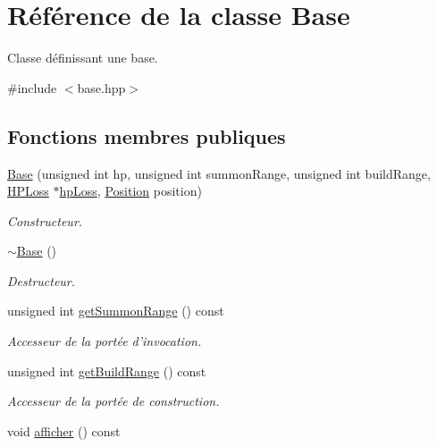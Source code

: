 \hypertarget{classBase}{\section{Référence de la classe Base}
\label{classBase}
}


Classe définissant une base.  




{\ttfamily \#include $<$base.\+hpp$>$}

\subsection*{Fonctions membres publiques}
\begin{DoxyCompactItemize}
\item 
\hypertarget{classBase_a32aefb7f04339edda2e2517502dd27b2}{\hyperlink{classBase_a32aefb7f04339edda2e2517502dd27b2}{Base} (unsigned int hp, unsigned int summon\+Range, unsigned int build\+Range, \hyperlink{classHPLoss}{H\+P\+Loss} $\ast$\hyperlink{classBase_a3f6ba779a531b048daa9cec42c945b91}{hp\+Loss}, \hyperlink{classPosition}{Position} position)}\label{classBase_a32aefb7f04339edda2e2517502dd27b2}

\begin{DoxyCompactList}\small\item\em Constructeur. \end{DoxyCompactList}\item 
\hypertarget{classBase_a722da881b6c70cfcbde9243abcfbf334}{\hyperlink{classBase_a722da881b6c70cfcbde9243abcfbf334}{$\sim$\+Base} ()}\label{classBase_a722da881b6c70cfcbde9243abcfbf334}

\begin{DoxyCompactList}\small\item\em Destructeur. \end{DoxyCompactList}\item 
unsigned int \hyperlink{classBase_a7f6a0b45ce6331d7bfb0d6f716d5ba60}{get\+Summon\+Range} () const 
\begin{DoxyCompactList}\small\item\em Accesseur de la portée d'invocation. \end{DoxyCompactList}\item 
unsigned int \hyperlink{classBase_a1bd08f26289caa9aa0028efd9dae8d9e}{get\+Build\+Range} () const 
\begin{DoxyCompactList}\small\item\em Accesseur de la portée de construction. \end{DoxyCompactList}\item 
\hypertarget{classBase_a1a3daeb406afce579a88debf4424b0a0}{void \hyperlink{classBase_a1a3daeb406afce579a88debf4424b0a0}{afficher} () const }\label{classBase_a1a3daeb406afce579a88debf4424b0a0}


\end{DoxyCompactItemize}

